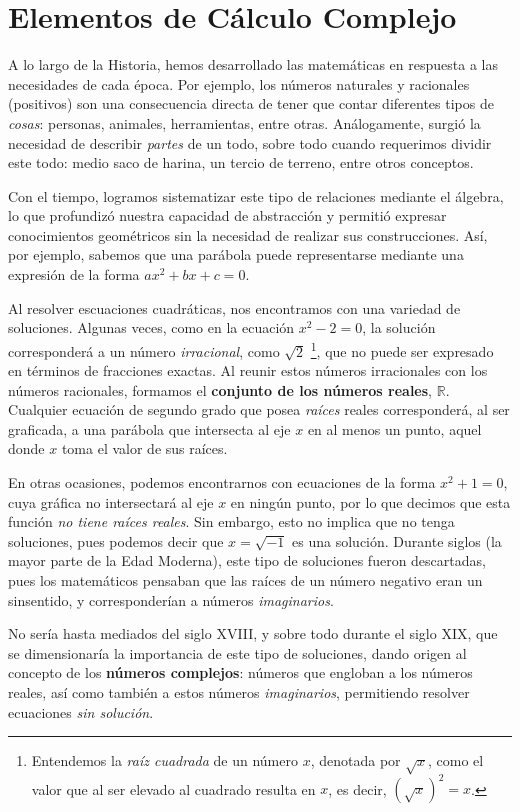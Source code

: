 \chapter{Elementos de Cálculo Complejo}

A lo largo de la Historia, hemos desarrollado las matemáticas en respuesta a las necesidades de cada época. Por ejemplo, los números naturales y racionales (positivos) son una consecuencia directa de tener que contar diferentes tipos de \emph{cosas}: personas, animales, herramientas, entre otras. Análogamente, surgió la necesidad de describir \emph{partes} de un todo, sobre todo cuando requerimos dividir este todo: medio saco de harina, un tercio de terreno, entre otros conceptos.

Con el tiempo, logramos sistematizar este tipo de relaciones mediante el álgebra, lo que profundizó nuestra capacidad de abstracción y permitió expresar conocimientos geométricos sin la necesidad de realizar sus construcciones. Así, por ejemplo, sabemos que una parábola puede representarse mediante una expresión de la forma $ax^2 + bx + c = 0$.

Al resolver escuaciones cuadráticas, nos encontramos con una variedad de soluciones. Algunas veces, como en la ecuación $x^2-2=0$, la solución corresponderá a un número \emph{irracional}, como $\sqrt{2}$
\footnote{Entendemos la \emph{raíz cuadrada} de un número $x$, denotada por $\sqrt{x}$, como el valor que al ser elevado al cuadrado resulta en $x$, es decir, $\left(\sqrt{x}\right)^2 = x$.},
que no puede ser expresado en términos de fracciones exactas. Al reunir estos números irracionales con los números racionales, formamos el \textbf{conjunto de los números reales}, $\mathbb{R}$. Cualquier ecuación de segundo grado que posea \emph{raíces} reales corresponderá, al ser graficada, a una parábola que intersecta al eje $x$ en al menos un punto, aquel donde $x$ toma el valor de sus raíces.

En otras ocasiones, podemos encontrarnos con ecuaciones de la forma $x^2+1 = 0$, cuya gráfica no intersectará al eje $x$ en ningún punto, por lo que decimos que esta función \emph{no tiene raíces reales}. Sin embargo, esto no implica que no tenga soluciones, pues podemos decir que $x = \sqrt{-1}$ es una solución. Durante siglos (la mayor parte de la Edad Moderna), este tipo de soluciones fueron descartadas, pues los matemáticos pensaban que las raíces de un número negativo eran un sinsentido, y corresponderían a números \emph{imaginarios}.

No sería hasta mediados del siglo XVIII, y sobre todo durante el siglo XIX, que se dimensionaría la importancia de este tipo de soluciones, dando origen al concepto de los \textbf{números complejos}: números que engloban a los números reales, así como también a estos números \emph{imaginarios}, permitiendo resolver ecuaciones \emph{sin solución}. 


